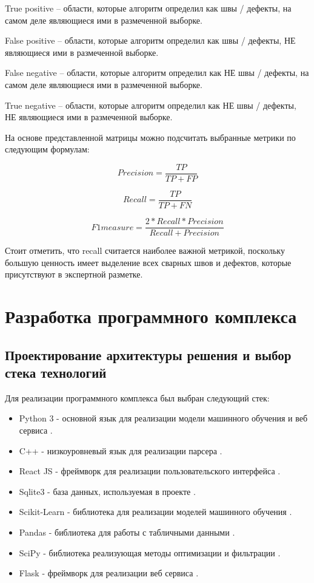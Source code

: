 \documentclass[a4paper,article,14pt]{extarticle}
\begin{document}
True positive – области, которые алгоритм определил как швы / дефекты, на самом деле являющиеся ими в размеченной выборке.

False positive – области, которые алгоритм определил как швы / дефекты, НЕ являющиеся ими в размеченной выборке.

False negative – области, которые алгоритм определил как НЕ швы / дефекты, на самом деле являющиеся ими в размеченной выборке.

True negative – области, которые алгоритм определил как НЕ швы / дефекты, НЕ являющиеся ими в размеченной выборке.

На основе представленной матрицы можно подсчитать выбранные метрики по следующим формулам:

\begin{equation}
    Precision = \frac{TP}{TP+FP}
\end{equation}

\begin{equation}
    Recall = \frac{TP}{TP+FN}
\end{equation}

\begin{equation}
    F1measure = \frac{2*Recall*Precision}{Recall+Precision}
\end{equation}

Стоит отметить, что recall считается наиболее важной метрикой, поскольку большую ценность имеет выделение всех сварных швов и дефектов, которые присутствуют в экспертной разметке. 

\pagebreak
\section{Разработка программного комплекса}
\subsection{Проектирование архитектуры решения и выбор стека технологий}

Для реализации программного комплекса был выбран следующий стек:
\begin{itemize}
    \item Python 3 - основной язык для реализации модели машинного обучения и веб сервиса \cite{s5}.
    \item C++ - низкоуровневый язык для реализации парсера \cite{s6}.
    \item React JS - фреймворк для реализации пользовательского интерфейса \cite{s7}.
    \item Sqlite3 - база данных, используемая в проекте \cite{s8}.
    \item Scikit-Learn - библиотека для реализации моделей машинного обучения \cite{s9}.
    \item Pandas - библиотека для работы с табличными данными \cite{s10}.
    \item SciPy - библиотека реализующая методы оптимизации и фильтрации \cite{s11}.
    \item Flask - фреймворк для реализации веб сервиса \cite{s12}. 
\end{itemize}
\end{document}
